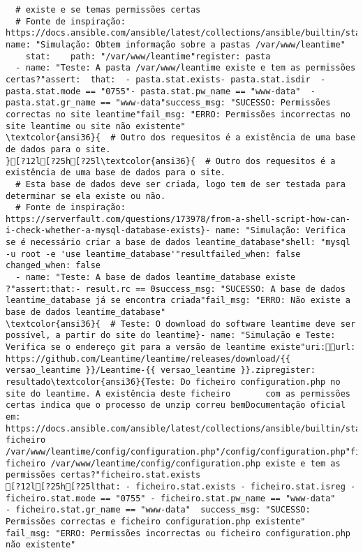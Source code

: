 \documentclass{scrartcl}
\begin{document}
\begin{Verbatim}
  # existe e se temas permissões certas
  # Fonte de inspiração: https://docs.ansible.com/ansible/latest/collections/ansible/builtin/stat_module.html}- name: "Simulação: Obtem informação sobre a pastas /var/www/leantime"
    stat:    path: "/var/www/leantime"register: pasta
  - name: "Teste: A pasta /var/www/leantime existe e tem as permissões certas?"assert:  that:  - pasta.stat.exists- pasta.stat.isdir  - pasta.stat.mode == "0755"- pasta.stat.pw_name == "www-data"  - pasta.stat.gr_name == "www-data"success_msg: "SUCESSO: Permissões correctas no site leantime"fail_msg: "ERRO: Permissões incorrectas no site leantime ou site não existente"
\textcolor{ansi36}{  # Outro dos requesitos é a existência de uma base de dados para o site.
}[?12l[?25h[?25l\textcolor{ansi36}{  # Outro dos requesitos é a existência de uma base de dados para o site.
  # Esta base de dados deve ser criada, logo tem de ser testada para determinar se ela existe ou não.
  # Fonte de inspiração: https://serverfault.com/questions/173978/from-a-shell-script-how-can-i-check-whether-a-mysql-database-exists}- name: "Simulação: Verifica se é necessário criar a base de dados leantime_database"shell: "mysql -u root -e 'use leantime_database'"resultfailed_when: false  changed_when: false
  - name: "Teste: A base de dados leantime_database existe ?"assert:that:- result.rc == 0success_msg: "SUCESSO: A base de dados leantime_database já se encontra criada"fail_msg: "ERRO: Não existe a base de dados leantime_database"
\textcolor{ansi36}{  # Teste: O download do software leantime deve ser possível, a partir do site do leantime}- name: "Simulação e Teste: Verifica se o endereço git para a versão de leantime existe"uri:url: https://github.com/Leantime/leantime/releases/download/{{ versao_leantime }}/Leantime-{{ versao_leantime }}.zipregister: resultado\textcolor{ansi36}{Teste: Do ficheiro configuration.php no site do leantime. A existência deste ficheiro       com as permissões certas indica que o processo de unzip correu bemDocumentação oficial em: https://docs.ansible.com/ansible/latest/collections/ansible/builtin/stat_module.html}o ficheiro /var/www/leantime/config/configuration.php"/config/configuration.php"ficheiroO ficheiro /var/www/leantime/config/configuration.php existe e tem as permissões certas?"ficheiro.stat.exists
[?12l[?25h[?25lthat: - ficheiro.stat.exists - ficheiro.stat.isreg - ficheiro.stat.mode == "0755" - ficheiro.stat.pw_name == "www-data"    - ficheiro.stat.gr_name == "www-data"  success_msg: "SUCESSO: Permissões correctas e ficheiro configuration.php existente"  fail_msg: "ERRO: Permissões incorrectas ou ficheiro configuration.php não existente"

\end{Verbatim}
\end{document}
